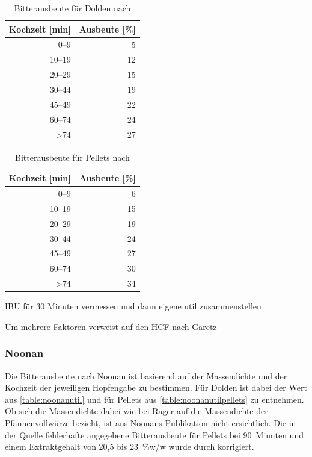 \documentclass[a4paper,parskip=half]{scrartcl}
\begin{document}
\begin{table}[H]
\centering
\begin{tabular}{rr}
\toprule
\multicolumn{1}{c}{\textbf{Kochzeit [min]}} & \multicolumn{1}{c}{\textbf{Ausbeute [\%]}} \\
\midrule
0–9            & 5  \\
10–19          & 12 \\
20–29          & 15 \\
30–44          & 19 \\
45–49          & 22 \\
60–74          & 24 \\
>74            & 27 \\
\bottomrule
\end{tabular}
\caption{Bitterausbeute für Dolden nach \citeauthor{Daniels1996} \parencite[80]{Daniels1996}}
\label{table:danielsutil}
\end{table}

\begin{table}[H]
\centering
\begin{tabular}{rr}
\toprule
\multicolumn{1}{c}{\textbf{Kochzeit [min]}} & \multicolumn{1}{c}{\textbf{Ausbeute [\%]}} \\
\midrule
0–9            & 6 \\
10–19          & 15 \\
20–29          & 19 \\
30–44          & 24 \\
45–49          & 27 \\
60–74          & 30 \\
>74            & 34 \\
\bottomrule
\end{tabular}
\caption{Bitterausbeute für Pellets nach \citeauthor{Daniels1996} \parencite[80]{Daniels1996}}
\label{table:danielsutilpellets}
\end{table}

\parencite[85]{Daniels1996}
IBU für 30 Minuten vermessen und dann eigene util zusammenstellen

\parencite[86]{Daniels1996}
Um mehrere Faktoren verweist auf den HCF nach Garetz

\subsubsection*{Noonan}

Die Bitterausbeute nach Noonan ist basierend auf der Massendichte und
der Kochzeit der jeweiligen Hopfengabe zu bestimmen. Für Dolden ist
dabei der Wert aus \autoref{table:noonanutil} und für Pellets aus
\autoref{table:noonanutilpellets} zu entnehmen. Ob sich die
Massendichte dabei wie bei Rager auf die Massendichte der Pfannenvollwürze
bezieht, ist aus Noonans Publikation nicht ersichtlich. Die in der Quelle
fehlerhafte angegebene Bitterausbeute für Pellets bei 90~Minuten und
einem Extraktgehalt von 20,5 bis 23~\%w/w wurde durch korrigiert.
\end{document}
